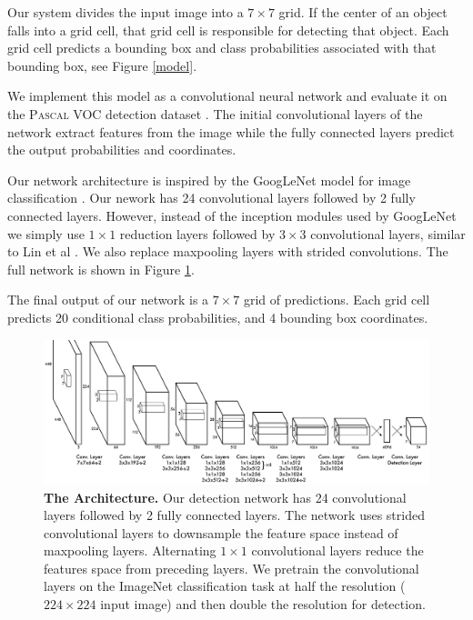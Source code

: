 \documentclass{article} %
\begin{document}
Our system divides the input image into a $7 \times 7$ grid. If the center of an object falls into a grid cell, that grid cell is responsible for detecting that object. Each grid cell predicts a bounding box and class probabilities associated with that bounding box, see Figure \ref{model}.

We implement this model as a convolutional neural network and evaluate it on the \textsc{Pascal} VOC detection dataset \cite{Everingham15}. The initial convolutional layers of the network extract features from the image while the fully connected layers predict the output probabilities and coordinates.

Our network architecture is inspired by the GoogLeNet model for image classification \cite{DBLP:journals/corr/SzegedyLJSRAEVR14}. Our nework has 24 convolutional layers followed by 2 fully connected layers. However, instead of the inception modules used by GoogLeNet we simply use $1 \times 1$ reduction layers followed by $3 \times 3$ convolutional layers, similar to Lin et al \cite{DBLP:journals/corr/LinCY13}. We also replace maxpooling layers with strided convolutions. The full network is shown in Figure \ref{net}.

The final output of our network is a $7 \times 7$ grid of predictions. Each grid cell predicts 20 conditional class probabilities, and 4 bounding box coordinates.

   \begin{figure}[t]
      \centering
        \includegraphics[width=\linewidth]{net}
      \caption{\small \textbf{The Architecture.} Our detection network has 24 convolutional layers followed by 2 fully connected layers. The network uses strided convolutional layers to downsample the feature space instead of maxpooling layers. Alternating $1 \times 1$ convolutional layers reduce the features space from preceding layers. We pretrain the convolutional layers on the ImageNet classification task at half the resolution ($224 \times 224$ input image) and then double the resolution for detection.}\vspace{-.3cm}
      \label{net}
   \end{figure}
\end{document}
